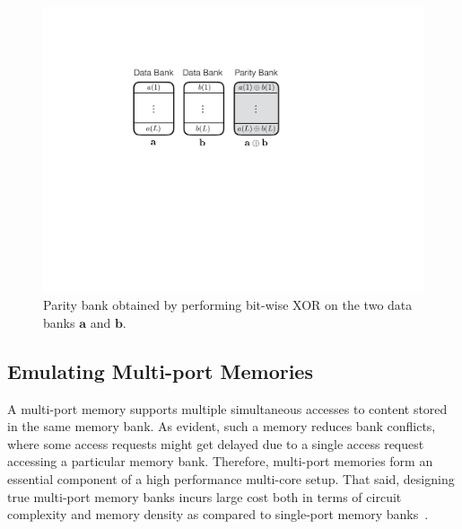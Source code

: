 \begin{figure}[t!]
  \centering
  \includegraphics[width=0.65\linewidth]{figures/example-inter-bank.pdf} 
  \caption{Parity bank obtained by performing bit-wise XOR on the two data banks $\mathbf{a}$ and $\mathbf{b}$.}
  \label{fig:example1}
\end{figure}

%
\subsection{Emulating Multi-port Memories}
\label{sec:emulation}
A multi-port memory supports multiple simultaneous accesses to content stored in the same memory bank. As evident, such a memory reduces bank conflicts, where some access requests might get delayed due to a single access request accessing a particular memory bank. Therefore, multi-port memories form an essential component of a high performance multi-core setup. That said, designing true multi-port memory banks incurs large cost both in terms of circuit complexity and memory density as compared to single-port memory banks~\cite{Suzuki,WLCH14}.

